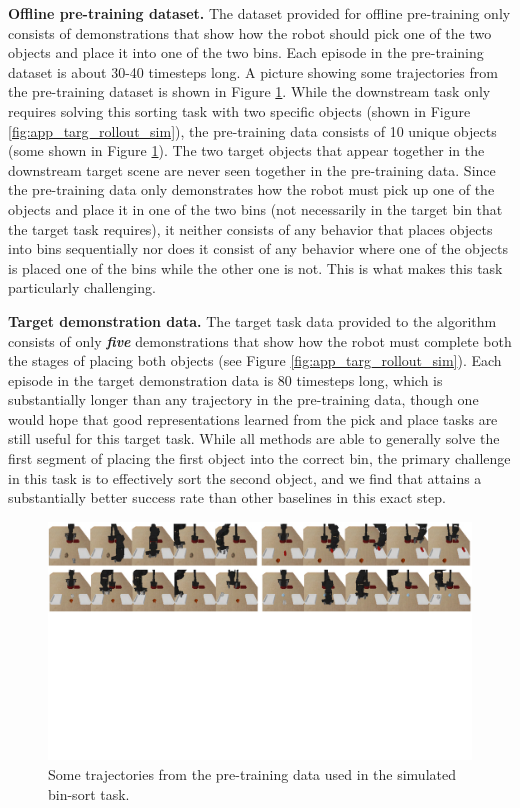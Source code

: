 \documentclass[../thesis.tex]{subfiles}
\begin{document}
\textbf{Offline pre-training dataset.} The dataset provided for offline pre-training only consists of demonstrations that show how the robot should pick one of the two objects and place it into one of the two bins. Each episode in the pre-training dataset is about 30-40 timesteps long. A picture showing some trajectories from the pre-training dataset is shown in Figure \ref{fig:app_pretrain_rollout_sim}. While the downstream task only requires solving this sorting task with two specific objects (shown in Figure \ref{fig:app_targ_rollout_sim}), the pre-training data consists of 10 unique objects (some shown in Figure \ref{fig:app_pretrain_rollout_sim}). The two target objects that appear together in the downstream target scene are never seen together in the pre-training data. Since the pre-training data only demonstrates how the robot must pick up one of the objects and place it in one of the two bins (not necessarily in the target bin that the target task requires), it neither consists of any behavior that places objects into bins sequentially nor does it consist of any behavior where one of the objects is placed one of the bins while the other one is not. This is what makes this  task particularly challenging.

\textbf{Target demonstration data.} The target task data provided to the algorithm consists of only \textbf{\emph{five}} demonstrations that show how the robot must complete both the stages of placing both objects (see Figure \ref{fig:app_targ_rollout_sim}). Each episode in the target demonstration data is 80 timesteps long, which is substantially longer than any trajectory in the pre-training data, though one would hope that good representations learned from the pick and place tasks are still useful for this target task. While all methods are able to generally solve the first segment of placing the first object into the correct bin, the primary challenge in this task is to effectively sort the second object, and we find that \ptrmethodname attains a substantially better success rate than other baselines in this exact step.  

\begin{figure}
\centering
  \includegraphics[width=\textwidth]{chapters/ptr/BinsortPretrainTrajAppendix.pdf}
  \caption{\label{fig:app_pretrain_rollout_sim} \footnotesize {Some trajectories from the pre-training data used in the simulated bin-sort task.}}
\end{figure}
\end{document}
